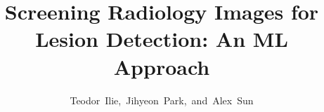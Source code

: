 %



\documentclass[journal]{IEEEtran}

\usepackage{xcolor,soul,framed} %

\usepackage[pdftex]{graphicx}
\graphicspath{{../images/}}

\usepackage[cmex10]{amsmath}
\usepackage{array}
\usepackage{mdwmath}
\usepackage{mdwtab}
\usepackage{eqparbox}
\usepackage{url}





    \title{Screening  Radiology  Images  for Lesion  Detection: An ML Approach}
  \author{Teodor~Ilie,~Jihyeon~Park,~and~Alex~Sun%

}  

\markboth{}{}

\maketitle


